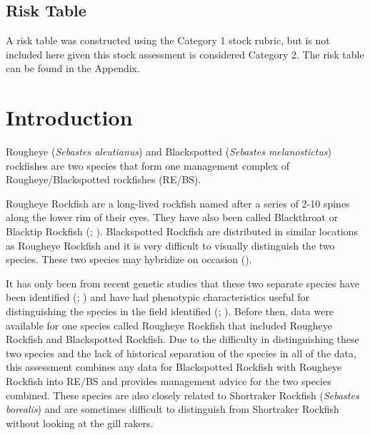 \documentclass[
]{article}
\begin{document}
\subsection*{Risk Table}\label{risk-table}

A risk table was constructed using the Category 1 stock rubric, but is
not included here given this stock assessment is considered Category 2.
The risk table can be found in the Appendix.

\newpage{}

\setlength{\parskip}{5mm plus1mm minus1mm}
\setcounter{page}{1}
\setcounter{section}{0}
\renewcommand{\thefigure}{\arabic{figure}}
\setcounter{figure}{0}
\renewcommand{\thetable}{\arabic{table}}
\setcounter{table}{-1}

\section{Introduction}\label{introduction}

Rougheye (\emph{Sebastes aleutianus}) and Blackspotted (\emph{Sebastes
melanostictus}) rockfishes are two species that form one management
complex of Rougheye/Blackspotted rockfishes (RE/BS).

Rougheye Rockfish are a long-lived rockfish named after a series of 2-10
spines along the lower rim of their eyes. They have also been called
Blackthroat or Blacktip Rockfish
(;
). Blackspotted Rockfish
are distributed in similar locations as Rougheye Rockfish and it is very
difficult to visually distinguish the two species. These two species may
hybridize on occasion ().

It has only been from recent genetic studies that these two separate
species have been identified
(;
) and have
had phenotypic characteristics useful for distinguishing the species in
the field identified (; ).
Before then, data were available for one species called Rougheye
Rockfish that included Rougheye Rockfish and Blackspotted Rockfish. Due
to the difficulty in distinguishing these two species and the lack of
historical separation of the species in all of the data, this assessment
combines any data for Blackspotted Rockfish with Rougheye Rockfish into
RE/BS and provides management advice for the two species combined. These
species are also closely related to Shortraker Rockfish (\emph{Sebastes
borealis}) and are sometimes difficult to distinguish from Shortraker
Rockfish without looking at the gill rakers.
\end{document}
